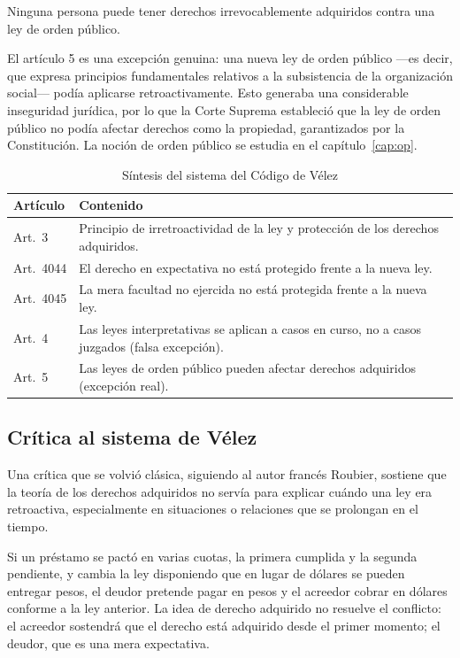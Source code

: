 \documentclass[12pt,oneside]{book}
\begin{document}
\begin{regla}
Ninguna persona puede tener derechos irrevocablemente adquiridos contra una ley de orden público.
\end{regla}

\begin{importante}
El artículo 5 es una excepción genuina: una nueva ley de orden público ---es decir, que expresa principios fundamentales relativos a la subsistencia de la organización social--- podía aplicarse retroactivamente. Esto generaba una considerable inseguridad jurídica, por lo que la Corte Suprema estableció que la ley de orden público no podía afectar derechos como la propiedad, garantizados por la Constitución. La noción de orden público se estudia en el capítulo~\ref{cap:op}.
\end{importante}

\begin{table}[H]
\centering
\begin{tabularx}{\textwidth}{B{0.17\textwidth} Y}
\toprule
\textbf{Artículo} & \textbf{Contenido} \\
\midrule
Art.~3 & Principio de irretroactividad de la ley y protección de los derechos adquiridos. \\
Art.~4044 & El derecho en expectativa no está protegido frente a la nueva ley. \\
Art.~4045 & La mera facultad no ejercida no está protegida frente a la nueva ley. \\
Art.~4 & Las leyes interpretativas se aplican a casos en curso, no a casos juzgados (falsa excepción). \\
Art.~5 & Las leyes de orden público pueden afectar derechos adquiridos (excepción real). \\
\bottomrule
\end{tabularx}
\caption{Síntesis del sistema del Código de Vélez}
\end{table}

\subsection{Crítica al sistema de Vélez}

Una crítica que se volvió clásica, siguiendo al autor francés Roubier, sostiene que la teoría de los derechos adquiridos no servía para explicar cuándo una ley era retroactiva, especialmente en situaciones o relaciones que se prolongan en el tiempo.

\begin{ejemplo}
Si un préstamo se pactó en varias cuotas, la primera cumplida y la segunda pendiente, y cambia la ley disponiendo que en lugar de dólares se pueden entregar pesos, el deudor pretende pagar en pesos y el acreedor cobrar en dólares conforme a la ley anterior. La idea de derecho adquirido no resuelve el conflicto: el acreedor sostendrá que el derecho está adquirido desde el primer momento; el deudor, que es una mera expectativa.
\end{ejemplo}
\end{document}
